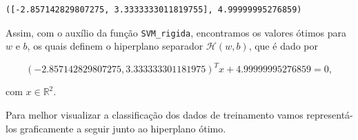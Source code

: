 \documentclass[12pt,a4paper]{scrartcl}
\makeatletter
\theoremstyle{definition}%
\newcommand{\boxspacing}{\kern\kvtcb@left@rule\kern\kvtcb@boxsep}
\newcommand{\prompt}[4]{
        \ttfamily\llap{{\color{#2}[#3]:\hspace{3pt}#4}}\vspace{-\baselineskip}
    }
\makeatother
\begin{document}
            \begin{tcolorbox}[breakable, size=fbox, boxrule=.5pt, pad at break*=1mm, opacityfill=0]
\prompt{Out}{outcolor}{8}{\boxspacing}
\begin{Verbatim}[commandchars=\\\{\}]
([-2.857142829807275, 3.3333333011819755], 4.99999995276859)
\end{Verbatim}
\end{tcolorbox}
        
    Assim, com o auxílio da função \texttt{SVM\_rigida}, encontramos os
valores ótimos para \(w\) e \(b\), os quais definem o hiperplano
separador \(\mathcal{H}(w,b)\), que é dado por

\[
(-2.857142829807275, 3.333333301181975)^{T} x + 4.99999995276859 = 0,
\]

com \(x \in \mathbb{R}^{2}\).

Para melhor visualizar a classificação dos dados de treinamento vamos
representá-los graficamente a seguir junto ao hiperplano ótimo.
\end{document}
